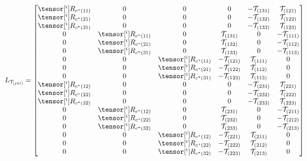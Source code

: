 \begin{equation}
\begin{gathered}
 L_{\mathcal{T}_{(jkl)}} = %
  \begin{bmatrix}
      \tensor[^{i}]{R}{_{c^*(11)}} & 0 & 0 & 0 & - \mathcal{T}_{(131)} & \mathcal{T}_{(121)}\\
      \tensor[^{i}]{R}{_{c^*(21)}} & 0 & 0 & 0 & - \mathcal{T}_{(132)} & \mathcal{T}_{(122)}\\
      \tensor[^{i}]{R}{_{c^*(31)}} & 0 & 0 & 0 & - \mathcal{T}_{(133)} & \mathcal{T}_{(123)}\\

      0 & \tensor[^{i}]{R}{_{c^*(11)}} & 0 & \mathcal{T}_{(131)} & 0 & - \mathcal{T}_{(111)}\\
      0 & \tensor[^{i}]{R}{_{c^*(21)}} & 0 & \mathcal{T}_{(132)} & 0 & - \mathcal{T}_{(112)}\\
      0 & \tensor[^{i}]{R}{_{c^*(31)}} & 0 & \mathcal{T}_{(133)} & 0 & - \mathcal{T}_{(113)}\\

      0 & 0 & \tensor[^{i}]{R}{_{c^*(11)}} & - \mathcal{T}_{(121)} & \mathcal{T}_{(111)} & 0 \\
      0 & 0 & \tensor[^{i}]{R}{_{c^*(21)}} & - \mathcal{T}_{(122)} & \mathcal{T}_{(112)} & 0 \\
      0 & 0 & \tensor[^{i}]{R}{_{c^*(31)}} & - \mathcal{T}_{(123)} & \mathcal{T}_{(113)} & 0 \\


      \tensor[^{i}]{R}{_{c^*(12)}} & 0 & 0 & 0 & - \mathcal{T}_{(231)} & \mathcal{T}_{(221)}\\
      \tensor[^{i}]{R}{_{c^*(22)}} & 0 & 0 & 0 & - \mathcal{T}_{(232)} & \mathcal{T}_{(222)}\\
      \tensor[^{i}]{R}{_{c^*(32)}} & 0 & 0 & 0 & - \mathcal{T}_{(233)} & \mathcal{T}_{(223)}\\

      0 & \tensor[^{i}]{R}{_{c^*(12)}} & 0 & \mathcal{T}_{(231)} & 0 & - \mathcal{T}_{(211)}\\
      0 & \tensor[^{i}]{R}{_{c^*(22)}} & 0 & \mathcal{T}_{(232)} & 0 & - \mathcal{T}_{(212)}\\
      0 & \tensor[^{i}]{R}{_{c^*(32)}} & 0 & \mathcal{T}_{(233)} & 0 & - \mathcal{T}_{(213)}\\

      0 & 0 & \tensor[^{i}]{R}{_{c^*(12)}} & - \mathcal{T}_{(221)} & \mathcal{T}_{(211)} & 0 \\
      0 & 0 & \tensor[^{i}]{R}{_{c^*(22)}} & - \mathcal{T}_{(222)} & \mathcal{T}_{(212)} & 0 \\
      0 & 0 & \tensor[^{i}]{R}{_{c^*(32)}} & - \mathcal{T}_{(223)} & \mathcal{T}_{(213)} & 0 \\



\end{bmatrix}
\end{gathered}
\end{equation}
